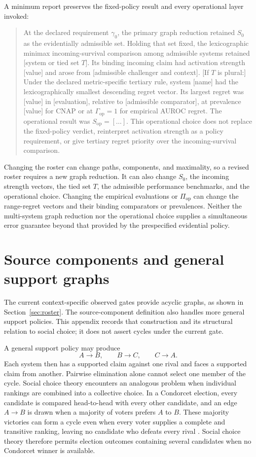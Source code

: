 \documentclass[11pt]{article}
\theoremstyle{remark}
\begin{document}
A minimum report preserves the fixed-policy result and every operational layer
invoked:
\begin{quote}
At the declared requirement $\gamma_0$, the primary graph reduction retained
$S_0$ as the evidentially admissible set. Holding that set fixed, the
lexicographic minimax incoming-survival comparison among admissible systems
retained [system or tied set $T$]. Its binding incoming claim had activation
strength [value] and arose from [admissible challenger and context]. [If $T$ is
plural:] Under the declared metric-specific tertiary rule,
system [name] had the lexicographically smallest descending regret
vector. Its largest regret was [value] in [evaluation], relative to
[admissible comparator], at prevalence [value] for CNAP or at
$\Gamma_{\mathrm{op}}=1$ for empirical AUROC regret. The operational result was
$S_{\mathrm{op}}=[\ldots]$. This operational choice does not replace the
fixed-policy verdict, reinterpret activation strength as a policy requirement,
or give tertiary regret priority over the incoming-survival comparison.
\end{quote}

Changing the roster can change paths, components, and maximality, so a revised
roster requires a new graph reduction. It can also change $S_0$, the incoming
strength vectors, the tied set $T$, the admissible performance benchmarks, and
the operational choice. Changing the empirical evaluations or
$\Pi_{\mathrm{op}}$ can change the range-regret vectors and their binding
comparators or prevalences. Neither the multi-system graph reduction nor the
operational choice supplies a simultaneous error guarantee beyond that
provided by the prespecified evidential policy.

\section{Source components and general support graphs}
\label{app:multi-system}

The current context-specific observed gates provide acyclic graphs, as shown
in Section~\ref{sec:roster}. The source-component definition also handles
more general support policies. This appendix records that construction and
its structural relation to social choice; it does not assert cycles under
the current gate.

A general support policy may produce
\[
A\longrightarrow B,\qquad B\longrightarrow C,\qquad
C\longrightarrow A.
\]
Each system then has a supported claim against one rival and faces a supported
claim from another. Pairwise elimination alone cannot select one member of the
cycle. Social choice theory encounters an analogous problem when individual
rankings are combined into a collective choice. In a Condorcet election,
every candidate is compared head-to-head with every other candidate, and an
edge $A\to B$ is drawn when a majority of voters prefers $A$ to $B$. These
majority victories can form a cycle even when every voter supplies a complete
and transitive ranking, leaving no candidate who defeats every rival
\cite{brandt2016computational}. Social choice theory therefore permits
election outcomes containing several candidates when no Condorcet winner is
available.
\end{document}
